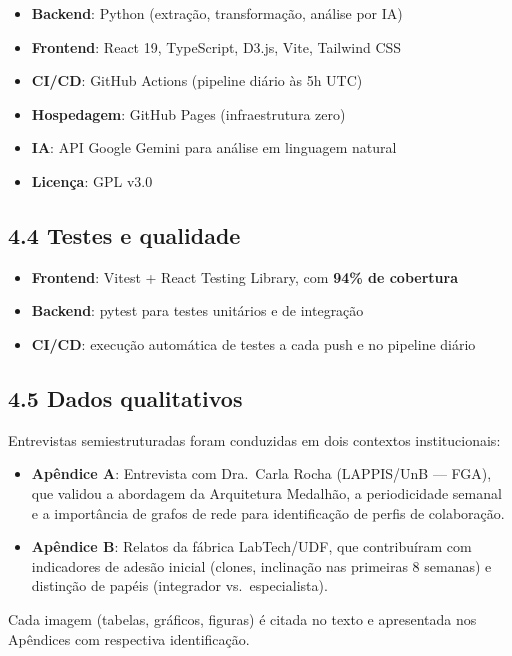 \documentclass[
	12pt,
	openright,
	oneside,
	a4paper,
	brazil
]{abntex2}
\begin{document}
\begin{itemize}
    \item \textbf{Backend}: Python (extração, transformação, análise por IA)
    \item \textbf{Frontend}: React 19, TypeScript, D3.js, Vite, Tailwind CSS
    \item \textbf{CI/CD}: GitHub Actions (pipeline diário às 5h UTC)
    \item \textbf{Hospedagem}: GitHub Pages (infraestrutura zero)
    \item \textbf{IA}: API Google Gemini para análise em linguagem natural
    \item \textbf{Licença}: GPL v3.0
\end{itemize}

\subsection*{4.4 Testes e qualidade}

\begin{itemize}
    \item \textbf{Frontend}: Vitest + React Testing Library, com \textbf{94\% de cobertura}
    \item \textbf{Backend}: pytest para testes unitários e de integração
    \item \textbf{CI/CD}: execução automática de testes a cada push e no pipeline diário
\end{itemize}

\subsection*{4.5 Dados qualitativos}

Entrevistas semiestruturadas foram conduzidas em dois contextos institucionais:
\begin{itemize}
    \item \textbf{Apêndice A}: Entrevista com Dra.\ Carla Rocha (LAPPIS/UnB --- FGA), que validou a abordagem da Arquitetura Medalhão, a periodicidade semanal e a importância de grafos de rede para identificação de perfis de colaboração.
    \item \textbf{Apêndice B}: Relatos da fábrica LabTech/UDF, que contribuíram com indicadores de adesão inicial (clones, inclinação nas primeiras 8 semanas) e distinção de papéis (integrador vs.\ especialista).
\end{itemize}

Cada imagem (tabelas, gráficos, figuras) é citada no texto e apresentada nos Apêndices com respectiva identificação.
\end{document}
